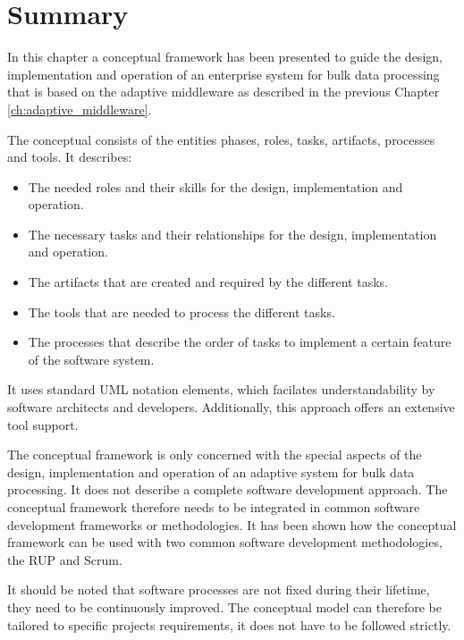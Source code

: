 \section{Summary}
\label{sec:ch6_summary}
In this chapter a conceptual framework has been presented to guide the design, implementation and operation of an enterprise system for bulk data processing that is based on the adaptive middleware as described in the previous Chapter \ref{ch:adaptive_middleware}.

The conceptual consists of the entities phases, roles, tasks, artifacts, processes and tools. It describes:
\begin{itemize}
	\item The needed roles and their skills for the design, implementation and operation.
	\item The necessary tasks and their relationships for the design, implementation and operation.
	\item The artifacts that are created and required by the different tasks.
	\item The tools that are needed to process the different tasks.
	\item The processes that describe the order of tasks to implement a certain feature of the software system.
\end{itemize}

It uses standard \ac{UML} notation elements, which facilates understandability by software architects and developers. Additionally, this approach offers an extensive tool support.

The conceptual framework is only concerned with the special aspects of the design, implementation and operation of an adaptive system for bulk data processing. It does not describe a complete software development approach. The conceptual framework therefore needs to be integrated in common software development frameworks or methodologies. It has been shown how the conceptual framework can be used with two common software development methodologies, the \ac{RUP} and Scrum.

It should be noted that software processes are not fixed during their lifetime, they need to be continuously improved. \citep{Fuggetta:2000ds}
The conceptual model can therefore be tailored to specific projects requirements, it does not have to be followed strictly.
